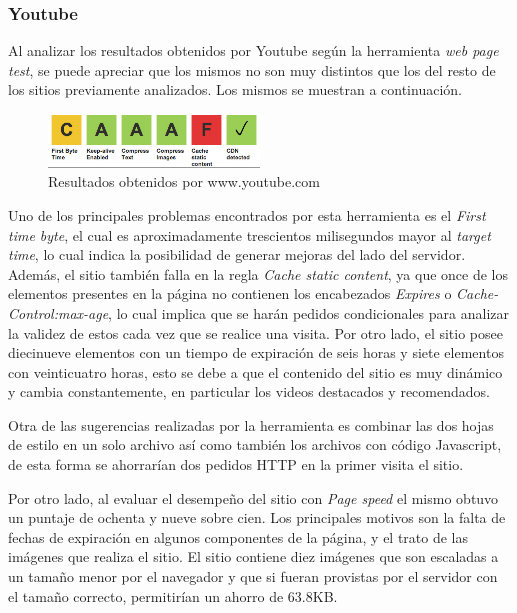 \subsubsection{Youtube}

Al analizar los resultados obtenidos por Youtube según la herramienta \emph{web page test}, se puede apreciar que los mismos no son muy distintos que los del resto de los sitios
previamente analizados. Los mismos se muestran a continuación.

\begin{figure}[h]
\centering
\includegraphics[width=0.5\textwidth]{figuras/lado_cliente/youtube/page_results.png}
  \caption{Resultados obtenidos por www.youtube.com}
    \label{fig.youtube_page_results}
\end{figure}

Uno de los principales problemas encontrados por esta herramienta es el \emph{First time byte}, el cual es aproximadamente trescientos milisegundos mayor al \emph{target time},
lo cual indica la posibilidad de generar mejoras del lado del servidor. Además, el sitio también falla en la regla \emph{Cache static content}, ya que once de los elementos presentes en la página no
contienen los encabezados \emph{Expires} o \emph{Cache-Control:max-age}, lo cual implica que se harán pedidos condicionales para analizar la validez de estos cada vez que se
realice una visita. Por otro lado, el sitio posee diecinueve elementos con un tiempo de expiración de seis horas y siete elementos con veinticuatro horas, esto se debe a que el
contenido del sitio es muy dinámico y cambia constantemente, en particular los videos destacados y recomendados.

Otra de las sugerencias realizadas por la herramienta es combinar las dos hojas de estilo en un solo archivo así como también los archivos con código Javascript, de esta forma
se ahorrarían dos pedidos HTTP en la primer visita el sitio.

Por otro lado, al evaluar el desempeño del sitio con \emph{Page speed} el mismo obtuvo un puntaje de ochenta y nueve sobre cien. Los principales motivos son la falta de fechas de
expiración en algunos componentes de la página, y el trato de las imágenes que realiza el sitio. 
El sitio contiene diez imágenes que son escaladas a un tamaño menor por el navegador y que si fueran provistas por el servidor con el tamaño correcto, permitirían un ahorro de 63.8KB.

